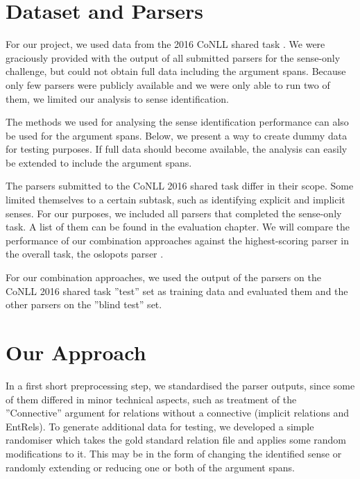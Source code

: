 \documentclass[10pt,notitlepage]{scrartcl}
\begin{document}
\section*{Dataset and Parsers}
For our project, we used data from the 2016 CoNLL shared task \cite{xue2016conll}. We were graciously provided with the output of all submitted parsers for the sense-only challenge, but could not obtain full data including the argument spans. Because only few parsers were publicly available and we were only able to run two of them, we limited our analysis to sense identification.

The methods we used for analysing the sense identification performance can also be used for the argument spans. Below, we present a way to create dummy data for testing purposes. If full data should become available, the analysis can easily be extended to include the argument spans.

The parsers submitted to the CoNLL 2016 shared task differ in their scope. Some limited themselves to a certain subtask, such as identifying explicit and implicit senses. For our purposes, we included all parsers that completed the sense-only task. A list of them can be found in the evaluation chapter. We will compare the performance of our combination approaches against the highest-scoring parser in the overall task, the oslopots parser \cite{oepen2016opt}.

For our combination approaches, we used the output of the parsers on the CoNLL 2016 shared task ''test'' set as training data and evaluated them and the other parsers on the ''blind test'' set.

\section*{Our Approach}
In a first short preprocessing step, we standardised the parser outputs, since some of them differed in minor technical aspects, such as treatment of the ''Connective'' argument for relations without a connective (implicit relations and EntRels). To generate additional data for testing, we developed a simple randomiser which takes the gold standard relation file and applies some random modifications to it. This may be in the form of changing the identified sense or randomly extending or reducing one or both of the argument spans.
\end{document}
